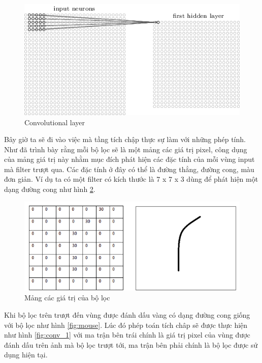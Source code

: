 		\begin{figure}[h!]
			\centering
			\includegraphics[scale=0.8]{charts/conv_layer2.png}
			\caption{Convolutional layer \cite{conv-layer}}
			\label{fig:conv_layer2}
		\end{figure}
		
		Bây giờ ta sẽ đi vào việc mà tầng tích chập thực sự làm với những phép tính. Như đã trình bày rằng mỗi bộ lọc sẽ là một mảng các giá trị pixel, công dụng của mảng giá trị này nhằm mục đích phát hiện các đặc tính của mỗi vùng input mà filter trượt qua. Các đặc tính ở đây có thể là đường thẳng, đường cong, màu đơn giản. Ví dụ ta có một filter có kích thước là 7 x 7 x 3 dùng để phát hiện một dạng đường cong như hình \ref{fig:filter}.
		
		\begin{figure}[h!]
			\centering
			\includegraphics[scale=0.5]{charts/filter.png}
			\caption{Mảng các giá trị của bộ lọc \cite{conv-layer}}
			\label{fig:filter}
		\end{figure}
		
		Khi bộ lọc trên trượt đến vùng được đánh dấu vàng có dạng đường cong giống với bộ lọc như hình \ref{fig:mouse}. Lúc đó phép toán   tích châp sẽ được thực hiện như hình \ref{fig:conv_1} với ma trận bên trái chính là giá trị pixel của vùng được đánh dấu trên ảnh mà bộ lọc trượt tới, ma trận bên phải chính là bộ lọc được sử dụng hiện tại.
		
